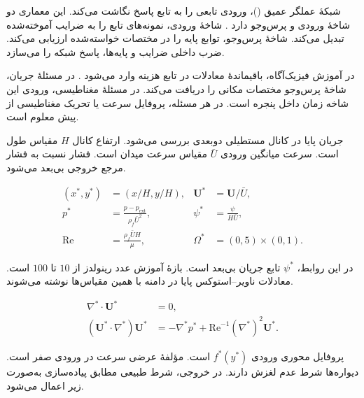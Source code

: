 \label{sec:theory-forward-operators}

شبکهٔ عملگر عمیق ()، ورودی تابعی را به تابع پاسخ نگاشت می‌کند.
این معماری دو شاخهٔ ورودی و پرس‌وجو دارد \cite{lu2021deeponet}.
شاخهٔ ورودی، نمونه‌های تابع را به ضرایب آموخته‌شده تبدیل می‌کند.
شاخهٔ پرس‌وجو، توابع پایه را در مختصات خواسته‌شده ارزیابی می‌کند.
ضرب داخلی ضرایب و پایه‌ها، پاسخ شبکه را می‌سازد.

در آموزش فیزیک‌آگاه، باقیماندهٔ معادلات در تابع هزینه وارد می‌شود \cite{wang2021pideeponet}.
در مسئلهٔ جریان، شاخهٔ پرس‌وجو مختصات مکانی را دریافت می‌کند.
در مسئلهٔ مغناطیسی، ورودی این شاخه زمان داخل پنجره است.
در هر مسئله، پروفایل سرعت یا تحریک مغناطیسی از پیش معلوم است.

\label{sec:forward-flow-operator}

جریان پایا در کانال مستطیلی دوبعدی بررسی می‌شود.
ارتفاع کانال $H$ مقیاس طول است.
سرعت میانگین ورودی $\bar U$ مقیاس سرعت میدان است.
فشار نسبت به فشار مرجع خروجی بی‌بعد می‌شود.

\begin{equation}
\begin{aligned}
(x^*,y^*) &= (x/H,y/H),&
\mathbf U^* &= \mathbf U/\bar U,\\
p^* &= \frac{p-p_{\mathrm{ext}}}{\rho_f\bar U^2},&
\psi^* &= \frac{\psi}{H\bar U},\\
\mathrm{Re} &= \frac{\rho_f\bar U H}{\mu},&
\Omega^* &= (0,5)\times(0,1).
\end{aligned}
\label{eq:forward-flow-scales}
\end{equation}

در این روابط، $\psi^*$ تابع جریان بی‌بعد است.
بازهٔ آموزش عدد رینولدز از $10$ تا $100$ است.
معادلات ناویر–استوکس پایا در دامنه با همین مقیاس‌ها نوشته می‌شوند.

\begin{equation}
\begin{aligned}
\nabla^*\!\cdot\mathbf U^* &=0,\\
(\mathbf U^*\!\cdot\nabla^*)\mathbf U^*
&=-\nabla^*p^*+\mathrm{Re}^{-1}(\nabla^*)^2\mathbf U^* .
\end{aligned}
\label{eq:forward-flow-equations}
\end{equation}

پروفایل محوری ورودی $f^*(y^*)$ است.
مؤلفهٔ عرضی سرعت در ورودی صفر است.
دیواره‌ها شرط عدم لغزش دارند.
در خروجی، شرط طبیعی مطابق پیاده‌سازی به‌صورت زیر اعمال می‌شود.

